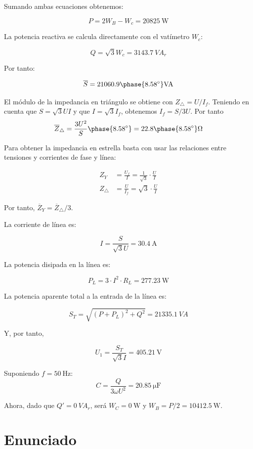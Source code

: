 Sumando ambas ecuaciones obtenemos:

\[
  P = 2 W_B - W_c = \SI{20825}{\watt}
\]

La potencia reactiva se calcula directamente con el vatímetro $W_c$:

\[
  Q = \sqrt{3} W_c = \SI{3143.7}{VA}_r
\]

Por tanto:

\[
  \overline{S} =
  21060.9\phase{\ang{8.58}}\unit{VA}
\]

El módulo de la impedancia en triángulo se obtiene con
$Z_{\triangle} = U / I_f$. Teniendo en cuenta que $S = \sqrt{3} U I$
y que $I = \sqrt{3} I_f$, obtenemos $I_f = S / 3U$. Por tanto
\[
  \overline{Z}_{\triangle} = \frac{3 U^2}{S}\phase{\ang{8.58}} =
  {22.8\phase{\ang{8.58}}}\unit{\ohm}
\]


Para obtener la impedancia en estrella basta con usar las relaciones
entre tensiones y corrientes de fase y línea:

\begin{align*}
  Z_Y &= \frac{U_f}{I} = \frac{1}{\sqrt{3}} \cdot \frac{U}{I}\\
  Z_\triangle &= \frac{U}{I_f} = \sqrt{3} \cdot \frac{U}{I}
\end{align*}

Por tanto, $\overline{Z}_{Y} = \overline{Z}_{\triangle} / 3$.

La corriente de línea es:

\[
  I = \frac{S}{\sqrt{3} U} = \SI{30.4}{\ampere}
\]

La potencia disipada en la línea es:

\[
  P_L = 3 \cdot I^2 \cdot R_L = \SI{277.23}{\watt}
\]

La potencia aparente total a la entrada de la línea es:

\[
  S_T = \sqrt{(P + P_L)^2 + Q^2} = \SI{21335.1}{VA}
\]

Y, por tanto,

\[
  U_1 = \frac{S_T}{\sqrt{3} I} = \SI{405.21}{\volt}
\]

Suponiendo $f = \SI{50}{\hertz}$:
\[
  C = \frac{Q}{3 \omega U^2} = \SI{20.85}{\micro\farad}
\]

Ahora, dado que $Q' = \SI{0}{VA}_r$, será $W_C = \SI{0}{\watt}$ y
$W_B = P/2 = \SI{10412.5}{\watt}$.



\section{Enunciado}

